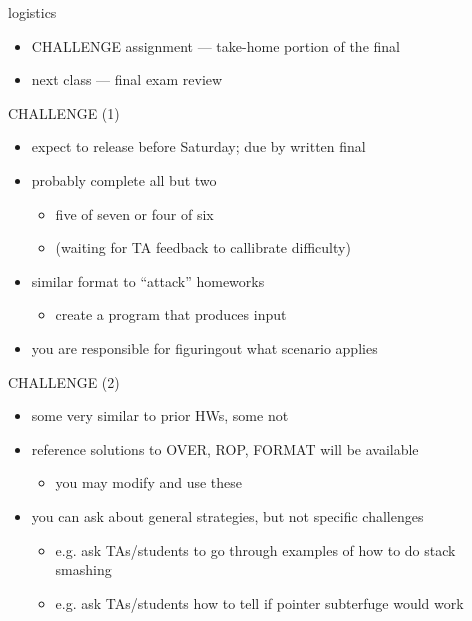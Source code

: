 \begin{frame}
    \titlepage
\end{frame}

\begin{frame}{logistics}
    \begin{itemize}
        \item CHALLENGE assignment --- take-home portion of the final
        \item next class --- final exam review
    \end{itemize}
\end{frame}

\begin{frame}{CHALLENGE (1)}
    \begin{itemize}
        \item expect to release before Saturday; due by written final
        \item probably complete all but two 
            \begin{itemize}
                \item five of seven or four of six
                \item (waiting for TA feedback to callibrate difficulty) 
            \end{itemize}
        \item similar format to ``attack'' homeworks
            \begin{itemize}
            \item create a program that produces input
            \end{itemize}
        \item you are responsible for figuringout what scenario applies
    \end{itemize}
\end{frame}

\begin{frame}{CHALLENGE (2)}
    \begin{itemize}
        \item some very similar to prior HWs, some not
        \item reference solutions to OVER, ROP, FORMAT will be available
            \begin{itemize}
            \item you may modify and use these
            \end{itemize}
        \item you can ask about general strategies, but not specific challenges
            \begin{itemize}
            \item e.g. ask TAs/students to go through examples of how to do stack smashing
            \item e.g. ask TAs/students how to tell if pointer subterfuge would work
            \end{itemize}
    \end{itemize}
\end{frame}

